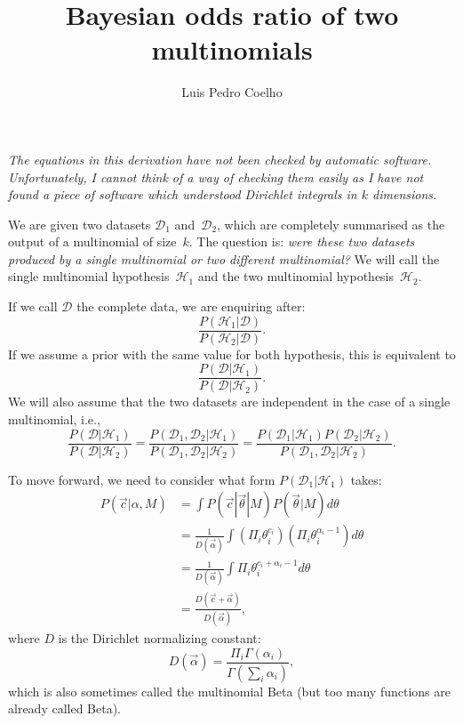\documentclass{article}
\let\product\Pi
\begin{document}
\title{Bayesian odds ratio of two multinomials}
\author{Luis Pedro Coelho}
\maketitle

\emph{The equations in this derivation have not been checked by automatic
software. Unfortunately, I cannot think of a way of checking them easily as I
have not found a piece of software which understood Dirichlet integrals in $k$
dimensions.}

\bigbreak

We are given two datasets $\mathcal{D}_1$ and~$\mathcal{D}_2$, which are
completely summarised as the output of a multinomial of size~$k$. The question
is: \emph{were these two datasets produced by a single multinomial or two
different multinomial?} We will call the single multinomial
hypothesis~$\mathcal{H}_1$ and the two multinomial hypothesis~$\mathcal{H}_2$.

If we call $\mathcal{D}$ the complete data, we are enquiring after:
\begin{equation}
\frac{P(\mathcal{H}_1|\mathcal{D})}{P(\mathcal{H}_2|\mathcal{D})}.
\label{eq:odds}
\end{equation}
If we assume a prior with the same value for both hypothesis, this is equivalent to
\begin{equation}
\frac{P(\mathcal{D}|\mathcal{H}_1)}{P(\mathcal{D}|\mathcal{H}_2)}.
\label{eq:odds-reversed}
\end{equation}
We will also assume that the two datasets are independent in the case of a single multinomial, i.e.,
\begin{equation}
\frac{P(\mathcal{D}|\mathcal{H}_1)}{P(\mathcal{D}|\mathcal{H}_2)} = 
\frac{P(\mathcal{D}_1,\mathcal{D}_2|\mathcal{H}_1)}{P(\mathcal{D}_1,\mathcal{D}_2|\mathcal{H}_2)} =
\frac{P(\mathcal{D}_1|\mathcal{H}_1)P(\mathcal{D}_2|\mathcal{H}_2)}{P(\mathcal{D}_1,\mathcal{D}_2|\mathcal{H}_2)}.
\label{eq:p1p2-overp12}
\end{equation}

To move forward, we need to consider what form $P(\mathcal{D}_1|\mathcal{H}_1)$ takes:
\begin{align}
P(\vec{c}|\alpha,M)
    &= \int P(\vec{c}|\vec{\theta}|M)P(\vec{\theta}|M) d\theta \\
    &= \frac{1}{D(\vec{\alpha})}{\int (\product_i \theta_i^{c_i})(\product_i \theta_i^{\alpha_i-1}) d\theta} \\
    &= \frac{1}{D(\vec{\alpha})}{\int \product_i \theta_i^{c_i + \alpha_i - 1} d\theta} \\
    &= \frac{D(\vec{c} + \vec{\alpha})}{D(\vec{\alpha})},
\end{align}
where $D$ is the Dirichlet normalizing constant:
\begin{equation}
D(\vec{\alpha}) = \frac{\product_i \Gamma(\alpha_i)}{\Gamma(\sum_i \alpha_i)},
\end{equation}
which is also sometimes called the multinomial Beta (but too many functions are
already called Beta).
\end{document}
